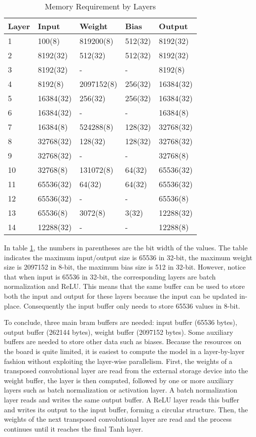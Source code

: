 \begin{table}[h]
  \centering
  \caption{Memory Requirement by Layers}
  \begin{tabular}{l | l | l | l | l}
    \toprule
    Layer & Input & Weight & Bias & Output \\
    \midrule
    1 & 100(8) & 819200(8) & 512(32) & 8192(32) \\
    2 & 8192(32) & 512(32) & 512(32) & 8192(32) \\
    3 & 8192(32) & - & - & 8192(8) \\
    4 & 8192(8) & 2097152(8) & 256(32) & 16384(32) \\
    5 & 16384(32) & 256(32) & 256(32) & 16384(32) \\
    6 & 16384(32) & - & - & 16384(8) \\
    7 & 16384(8) & 524288(8) & 128(32) & 32768(32) \\
    8 & 32768(32) & 128(32) & 128(32) & 32768(32) \\
    9 & 32768(32) & - & - & 32768(8) \\
    10 & 32768(8) & 131072(8) & 64(32) & 65536(32) \\
    11 & 65536(32) & 64(32) & 64(32) & 65536(32) \\
    12 & 65536(32) & - & - & 65536(8) \\
    13 & 65536(8) & 3072(8) & 3(32) & 12288(32) \\
    14 & 12288(32) & - & - & 12288(8) \\
    \bottomrule
  \end{tabular}
  \label{table:memory_requirements}
\end{table}

In table \ref{table:memory_requirements}, the numbers in parentheses are the bit width of the values. The table
indicates the maximum input/output size is 65536 in 32-bit, the maximum weight size is 2097152 in 8-bit, the
maximum bias size is 512 in 32-bit. However, notice that when input is 65536 in 32-bit, the corresponding
layers are batch normalization and ReLU. This means that the same buffer can be used to store both the
input and output for these layers because the input can be updated in-place. Consequently the input buffer only needs to
store 65536 values in 8-bit.

To conclude, three main \gls{bram} buffers are needed: input buffer (65536 bytes),
output buffer (262144 bytes),
weight buffer (2097152 bytes). Some auxiliary buffers are needed to store other data such as biases.
Because the resources on the board is quite limited, it is easiest to compute the model in a layer-by-layer
fashion without exploiting the layer-wise parallelism. First, the weights of a transposed
convolutional layer are read from the external storage device into the weight buffer,
the layer is then computed, followed by one or
more auxiliary layers such as batch normalization or activation layer. A batch normalization layer
reads and writes the same output buffer. A ReLU layer reads this buffer and writes its output to
the input buffer, forming a circular structure. Then, the weights of the next transposed
convolutional layer are read and the process continues until it reaches the final Tanh layer.


